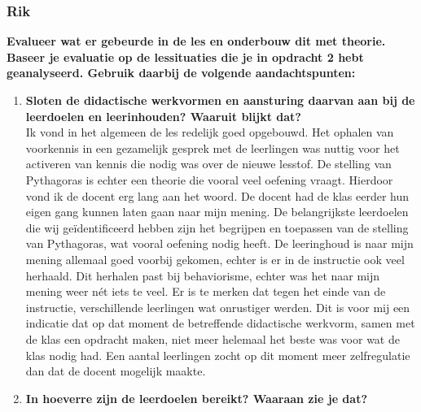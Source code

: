 \documentclass{article}
\begin{document}
            \subsubsection{Rik}
                \textbf{Evalueer wat er gebeurde in de les en onderbouw dit met theorie. Baseer je evaluatie op de lessituaties die je in opdracht 2 hebt geanalyseerd. Gebruik daarbij de volgende aandachtspunten: }
                \begin{enumerate}[label=(\alph*)]
                    \item \textbf{Sloten de didactische werkvormen en aansturing daarvan aan bij de leerdoelen en leerinhouden? Waaruit blijkt dat?} \\
                
                        Ik vond in het algemeen de les redelijk goed opgebouwd. Het ophalen van voorkennis in een gezamelijk gesprek met de leerlingen was nuttig voor het activeren van kennis die nodig was over de nieuwe lesstof. De stelling van Pythagoras is echter een theorie die vooral veel oefening vraagt. Hierdoor vond ik de docent erg lang aan het woord. De docent had de klas eerder hun eigen gang kunnen laten gaan naar mijn mening. De belangrijkste leerdoelen die wij geïdentificeerd hebben zijn het begrijpen en toepassen van de stelling van Pythagoras, wat vooral oefening nodig heeft. De leeringhoud is naar mijn mening allemaal goed voorbij gekomen, echter is er in de instructie ook veel herhaald. Dit herhalen past bij behaviorisme, echter was het naar mijn mening weer nét iets te veel. Er is te merken dat tegen het einde van de instructie, verschillende leerlingen wat onrustiger werden. Dit is voor mij een indicatie dat op dat moment de betreffende didactische werkvorm, samen met de klas een opdracht maken, niet meer helemaal het beste was voor wat de klas nodig had. Een aantal leerlingen zocht op dit moment meer zelfregulatie dan dat de docent mogelijk maakte. 
                
                    \item \textbf{In hoeverre zijn de leerdoelen bereikt? Waaraan zie je dat?} \\
                

\end{enumerate}
\end{document}
